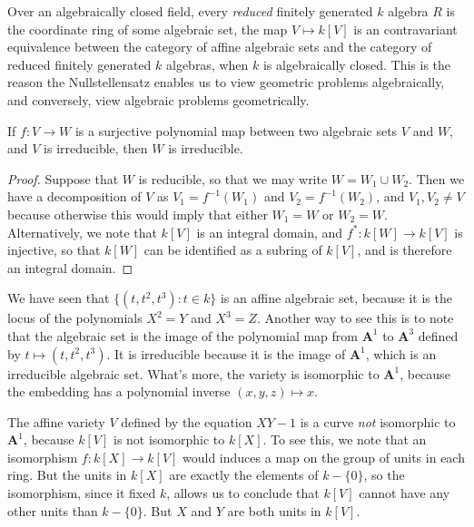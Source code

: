Over an algebraically closed field, every \emph{reduced} finitely generated $k$ algebra $R$ is the coordinate ring of some algebraic set, the map $V \mapsto k[V]$ is an contravariant equivalence between the category of affine algebraic sets and the category of reduced finitely generated $k$ algebras, when $k$ is algebraically closed. This is the reason the Nullstellensatz enables us to view geometric problems algebraically, and conversely, view algebraic problems geometrically.

\begin{prop}
    If $f: V \to W$ is a surjective polynomial map between two algebraic sets $V$ and $W$, and $V$ is irreducible, then $W$ is irreducible.
\end{prop}
\begin{proof}
    Suppose that $W$ is reducible, so that we may write $W = W_1 \cup W_2$. Then we have a decomposition of $V$ as $V_1 = f^{-1}(W_1)$ and $V_2 = f^{-1}(W_2)$, and $V_1, V_2 \neq V$ because otherwise this would imply that either $W_1 = W$ or $W_2 = W$. Alternatively, we note that $k[V]$ is an integral domain, and $f^*: k[W] \to k[V]$ is injective, so that $k[W]$ can be identified as a subring of $k[V]$, and is therefore an integral domain.
\end{proof}

\begin{example}
    We have seen that $\{ (t,t^2,t^3): t \in k \}$ is an affine algebraic set, because it is the locus of the polynomials $X^2 = Y$ and $X^3 = Z$. Another way to see this is to note that the algebraic set is the image of the polynomial map from $\mathbf{A}^1$ to $\mathbf{A}^3$ defined by $t \mapsto (t,t^2,t^3)$. It is irreducible because it is the image of $\mathbf{A}^1$, which is an irreducible algebraic set. What's more, the variety is isomorphic to $\mathbf{A}^1$, because the embedding has a polynomial inverse $(x,y,z) \mapsto x$.
\end{example}

\begin{example}
    The affine variety $V$ defined by the equation $XY - 1$ is a curve {\it not} isomorphic to $\mathbf{A}^1$, because $k[V]$ is not isomorphic to $k[X]$. To see this, we note that an isomorphism $f: k[X] \to k[V]$ would induces a map on the group of units in each ring. But the units in $k[X]$ are exactly the elements of $k - \{ 0 \}$, so the isomorphism, since it fixed $k$, allows us to conclude that $k[V]$ cannot have any other units than $k - \{ 0 \}$. But $X$ and $Y$ are both units in $k[V]$.
\end{example}

